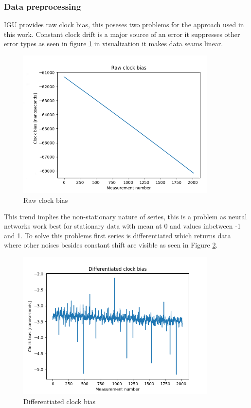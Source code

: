 \subsubsection{Data preprocessing}
IGU provides raw clock bias, this poseses two problems for the approach used in this work.
Constant clock drift is a major source of an error it suppresses other error types
as seen in figure \ref{fig:raw_bias} in visualization it makes data seams linear.
\begin{figure}[ht] 
	\centering
	\includegraphics[width=10cm]{figures/bias_raw}
	\caption{Raw clock bias}
	\label{fig:raw_bias}
\end{figure}
This trend implies the non-stationary nature of series, this is a problem as neural networks work 
best for stationary data with mean at 0 and values inbetween -1 and 1.
To solve this problems first series is differentiated which returns data where other noises 
besides constant shift are visible as seen in Figure \ref{fig:diffed_bias}.
\begin{figure}[ht] 
	\centering
	\includegraphics[width=10cm]{figures/bias_diffed}
	\caption{Differentiated clock bias}
	\label{fig:diffed_bias}
\end{figure}
